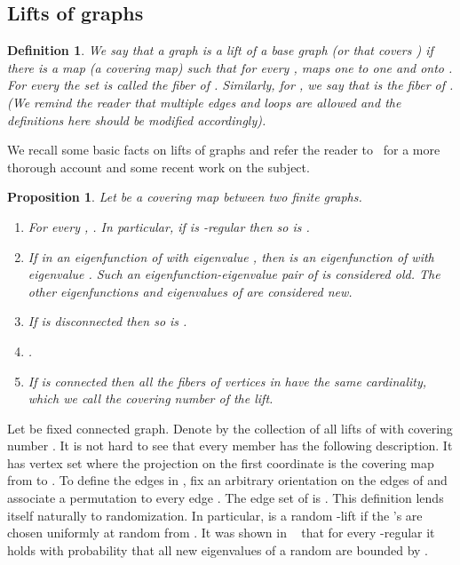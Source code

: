 \documentclass[12pt]{article}
\newtheorem{proposition}[theorem]{Proposition}
\newtheorem{open question}[theorem]{Open question}
\newtheorem{definition}[theorem]{Definition}
\begin{document}
\subsection{Lifts of graphs}\label{sub-se:lifts}
\begin{definition}
We say that a graph  is a {\em lift} of {\em a base graph}  (or that  {\em covers} ) if there
is a map  (a {\em covering map}) such that for every ,
 maps  one to one and onto .
For every  the set  is called the {\em fiber} of . 
Similarly, for , we say that  is the fiber of .
(We remind the reader that multiple edges and loops are allowed and the definitions here
should be modified accordingly).
\end{definition}
We recall some basic facts on lifts of graphs and refer the reader to~\cite{AL02,AL06,ALM02,LR05}
for a more thorough account and some recent work on the subject.
\begin{proposition}\label{lifts basic properties}
Let  be a covering map between two finite graphs.
\begin{enumerate}\label{pro:basic properties lifts}
\item For every , . In particular, if  is -regular then so is .
\item If  in an eigenfunction of  with eigenvalue ,
then  is an eigenfunction of  with eigenvalue .
Such an eigenfunction-eigenvalue pair of  is considered {\em old}. 
The other eigenfunctions and eigenvalues of  are considered {\em new}.
\item If  is disconnected then so is .
\item .
\item If  is connected then all the fibers of vertices in  have the same cardinality,
which we call the {\em covering number} of the lift.
\end{enumerate}
\end{proposition}

Let  be fixed connected graph. Denote by 
the collection of all lifts of  with covering number .
It is not hard to see that every
member  has the following description.
It has vertex set  where the projection on the first
coordinate is the covering map from  to . To define the edges in ,
fix an arbitrary orientation on the edges of  and associate a permutation  to every edge .
The edge set of  is . This definition
lends itself naturally to randomization. In particular,  is
a random -lift if the 's are chosen uniformly at random from .
It was shown in ~\cite{LP09} that for every -regular  it holds with probability
 that all new eigenvalues of a random  are bounded by .
\end{document}
